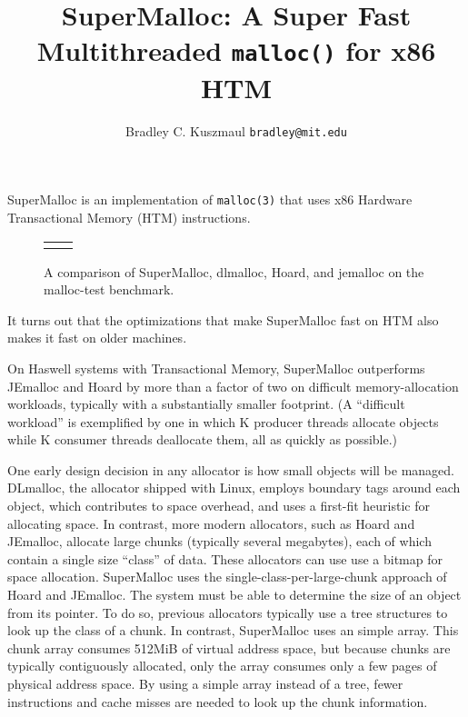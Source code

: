 \documentclass[10pt,letterpaper]{article}
\begin{document}
\title{SuperMalloc: A Super Fast Multithreaded \texttt{malloc()} for x86 HTM}
\author{Bradley C. Kuszmaul \hspace{0.2in} \texttt{bradley@mit.edu}}
\date{}
\maketitle

SuperMalloc is an implementation of \texttt{malloc(3)} that uses x86
Hardware Transactional Memory (HTM) instructions. 

\begin{figure}
\begin{tabular}{cc}

&

\end{tabular}
\caption{A comparison of SuperMalloc, dlmalloc, Hoard, and jemalloc on the malloc-test benchmark.}
\label{fig:data}
\end{figure}

It turns out that the optimizations that make SuperMalloc fast on HTM
also makes it fast on older machines.

On Haswell systems with
Transactional Memory, SuperMalloc outperforms JEmalloc and Hoard by
more than a factor of two on difficult memory-allocation workloads,
typically with a substantially smaller footprint. (A ``difficult
workload'' is exemplified by one in which K producer threads allocate
objects while K consumer threads deallocate them, all as quickly as
possible.)

One early design decision in any allocator is how small objects will be managed. DLmalloc, the allocator shipped with Linux, employs boundary tags around each object, which contributes to space overhead, and uses a first-fit heuristic for allocating space. In contrast, more modern allocators, such as Hoard and JEmalloc, allocate large chunks (typically several megabytes), each of which contain a single size ``class'' of data. These allocators can use use a bitmap for space allocation. SuperMalloc uses the single-class-per-large-chunk approach of Hoard and JEmalloc. The system must be able to determine the size of an object from its pointer. To do so, previous allocators typically use a tree structures to look up the class of a chunk. In contrast, SuperMalloc uses an simple array. This chunk array consumes 512MiB of virtual address space, but because chunks are typically contiguously allocated, only the array consumes only a few pages of physical address space. By using a simple array instead of a tree, fewer instructions and cache misses are needed to look up the chunk information.
\end{document}
